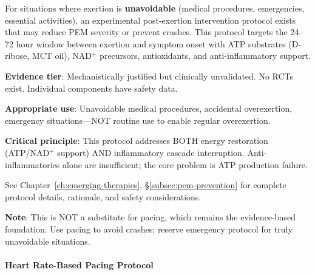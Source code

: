 \begin{keypoint}
For situations where exertion is \textbf{unavoidable} (medical procedures, emergencies, essential activities), an experimental post-exertion intervention protocol exists that may reduce PEM severity or prevent crashes. This protocol targets the 24--72 hour window between exertion and symptom onset with ATP substrates (D-ribose, MCT oil), NAD$^+$ precursors, antioxidants, and anti-inflammatory support.

\textbf{Evidence tier}: Mechanistically justified but clinically unvalidated. No RCTs exist. Individual components have safety data.

\textbf{Appropriate use}: Unavoidable medical procedures, accidental overexertion, emergency situations—NOT routine use to enable regular overexertion.

\textbf{Critical principle}: This protocol addresses BOTH energy restoration (ATP/NAD$^+$ support) AND inflammatory cascade interruption. Anti-inflammatories alone are insufficient; the core problem is ATP production failure.

See Chapter~\ref{ch:emerging-therapies}, \S\ref{subsec:pem-prevention} for complete protocol details, rationale, and safety considerations.

\textbf{Note}: This is NOT a substitute for pacing, which remains the evidence-based foundation. Use pacing to avoid crashes; reserve emergency protocol for truly unavoidable situations.
\end{keypoint}

\paragraph{Heart Rate-Based Pacing Protocol}

